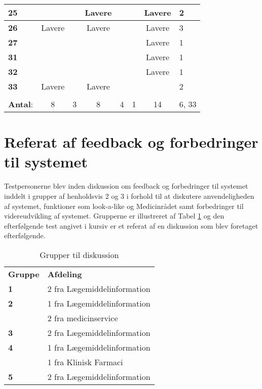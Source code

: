 \begin{table}[H]
\begin{tabular}{l|c|c|c|c|c|c|p{2cm}}
\cellcolor[HTML]{C0C0C0}\textbf{25} & & & Lavere & & & Lavere & \cellcolor[HTML]{EFEFEF} 2 \\\hline
\cellcolor[HTML]{C0C0C0}\textbf{26} & Lavere & & Lavere & & & Lavere  & \cellcolor[HTML]{EFEFEF} 3\\\hline
\cellcolor[HTML]{C0C0C0}\textbf{27} & & &  &  & & Lavere  & \cellcolor[HTML]{EFEFEF} 1\\\hline
\cellcolor[HTML]{C0C0C0}\textbf{31} & & &  &  & & Lavere & \cellcolor[HTML]{EFEFEF} 1 \\\hline
\cellcolor[HTML]{C0C0C0}\textbf{32} & & & & & & Lavere & \cellcolor[HTML]{EFEFEF}1 \\\hline
\cellcolor[HTML]{C0C0C0}\textbf{33} & Lavere & & Lavere & & & & \cellcolor[HTML]{EFEFEF} 2\\\hline
\rowcolor[HTML]{EFEFEF}\multicolumn{8}{r}{\textbf{Gennemsnit}}\\
\rowcolor[HTML]{EFEFEF} \textbf{Antal}: & 8 & 3 & 8 & 4 & 1 & 14  & 6, 33\\
\end{tabular}
\end{table}

\newpage
\section{Referat af feedback og forbedringer til systemet}
Testpersonerne blev inden diskussion om feedback og forbedringer til systemet inddelt i grupper af henholdsvis 2 og 3 i forhold til at diskutere anvendeligheden af systemet, funktioner som look-a-like og Medicinrådet samt forbedringer til videreudvikling af systemet. Grupperne er illustreret af Tabel \ref{table:grupper} og den efterfølgende test angivet i kursiv er et referat af en diskussion som blev foretaget efterfølgende.

\begin{table}[H]
\caption{Grupper til diskussion}
\vspace{2mm}
\label{table:grupper}
\centering
\begin{tabular}{l|l}
\rowcolor[HTML]{C0C0C0} \textbf{Gruppe} & \textbf{Afdeling} \\
\textbf{1} & 2 fra Lægemiddelinformation \\ \hline
\textbf{2} \multirow{2}{*}{} & 1 fra Lægemiddelinformation \\  & 2 fra medicinservice\\ \hline
\textbf{3} & 2 fra Lægemiddelinformation \\ \hline
\textbf{4}\multirow{2}{*}{} & 1 fra Lægemiddelinformation \\  & 1 fra Klinisk Farmaci \\ \hline
\textbf{5} & 2 fra Lægemiddelinformation \\ 
\end{tabular}
\end{table}


